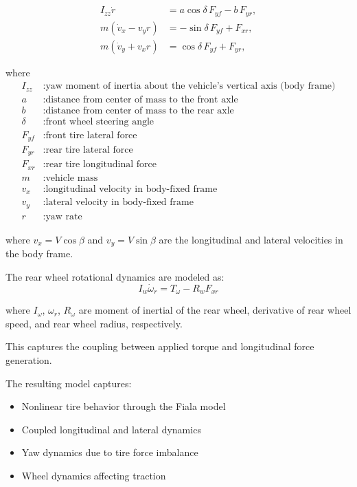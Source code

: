\documentclass{article}
\begin{document}
\begin{align}
I_{zz} \dot{r} &= a \cos\delta \, F_{yf} - b \, F_{yr}, \\
m(\dot{v}_x - v_y r) &= -\sin\delta \, F_{yf} + F_{xr}, \\
m(\dot{v}_y + v_x r) &= \cos\delta \, F_{yf} + F_{yr},
\end{align}

where
\begin{align*}
I_{zz} &: \text{yaw moment of inertia about the vehicle's vertical axis (body frame)} \\
a &: \text{distance from center of mass to the front axle} \\
b &: \text{distance from center of mass to the rear axle} \\
\delta &: \text{front wheel steering angle} \\
F_{yf} &: \text{front tire lateral force} \\
F_{yr} &: \text{rear tire lateral force} \\
F_{xr} &: \text{rear tire longitudinal force} \\
m &: \text{vehicle mass} \\
v_x &: \text{longitudinal velocity in body-fixed frame} \\
v_y &: \text{lateral velocity in body-fixed frame} \\
r &: \text{yaw rate} 
\end{align*}

where $v_x = V \cos\beta$ and $v_y = V \sin\beta$ are the longitudinal and lateral velocities in the body frame.

The rear wheel rotational dynamics are modeled as:
\begin{equation}
I_w \dot{\omega}_r = T_\omega - R_w F_{xr}
\end{equation}

where $I_\omega$, $\omega_r$, $R_\omega$ are moment of inertial of the rear wheel, derivative of rear wheel speed, and rear wheel radius, respectively. 

This captures the coupling between applied torque and longitudinal force generation.

The resulting model captures:
\begin{itemize}
    \item Nonlinear tire behavior through the Fiala model
    \item Coupled longitudinal and lateral dynamics
    \item Yaw dynamics due to tire force imbalance
    \item Wheel dynamics affecting traction
\end{itemize}
\end{document}
